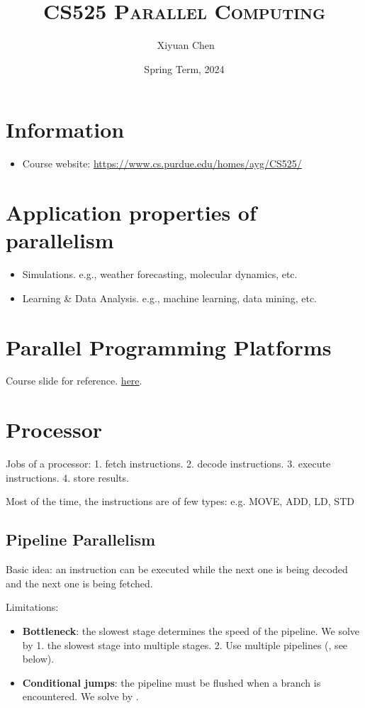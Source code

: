 \documentclass{../../ainote}
\author{\ccLogo \,\,Xiyuan Chen}
\title{\textsc{CS525 Parallel Computing}}
\date{Spring Term, 2024}
\begin{document}
\maketitle
\doclicenseThis
\section*{Information}
\begin{itemize}
	\item Course website: \url{https://www.cs.purdue.edu/homes/ayg/CS525/}
\end{itemize}
\tableofcontents
\newpage

\section{Application properties of parallelism}
\begin{itemize}
    \item Simulations. e.g., weather forecasting, molecular dynamics, etc.
    \item Learning \& Data Analysis. e.g., machine learning, data mining, etc.
\end{itemize}

\section{Parallel Programming Platforms}
Course slide for reference. \href{https://www.cs.purdue.edu/homes/ayg/CS525_SPR17/chap2_slides.pdf}{here}.

\section{Processor}
Jobs of a processor: 1. fetch instructions. 2. decode instructions. 3. execute instructions. 4. store results.

Most of the time, the instructions are of few types: e.g. MOVE, ADD, LD, STD

\subsection{Pipeline Parallelism}
Basic idea: an instruction can be executed while the next one is being decoded and the next one is being fetched.

Limitations: 
\begin{itemize}
    \item \textbf{Bottleneck}: the slowest stage determines the speed of the pipeline. We solve by 1.  the slowest stage into multiple stages. 2. Use multiple pipelines (, see below).
    \item \textbf{Conditional jumps}: the pipeline must be flushed when a branch is encountered. We solve by .
\end{itemize}
\end{document}
